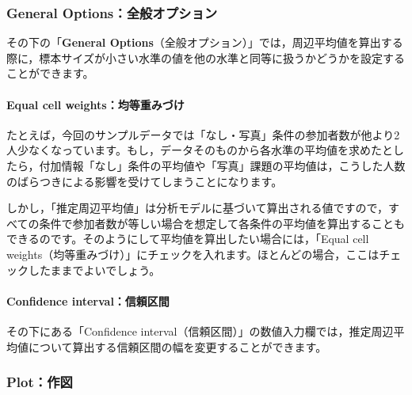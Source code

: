 \documentclass[
  12pt,
  a5jpaper,
  lualatex, ja=standard]{bxjsbook}
\begin{document}
\hypertarget{general-optionsux5168ux822cux30aaux30d7ux30b7ux30e7ux30f3}{%
\subsubsection*{General Options：全般オプション}\label{general-optionsux5168ux822cux30aaux30d7ux30b7ux30e7ux30f3}}

その下の「\textbf{General Options}（全般オプション）」では，周辺平均値を算出する際に，標本サイズが小さい水準の値を他の水準と同等に扱うかどうかを設定することができます。

\hypertarget{equal-cell-weightsux5747ux7b49ux91cdux307fux3065ux3051}{%
\paragraph*{Equal cell weights：均等重みづけ}\label{equal-cell-weightsux5747ux7b49ux91cdux307fux3065ux3051}}

たとえば，今回のサンプルデータでは「なし・写真」条件の参加者数が他より2人少なくなっています。もし，データそのものから各水準の平均値を求めたとしたら，付加情報「なし」条件の平均値や「写真」課題の平均値は，こうした人数のばらつきによる影響を受けてしまうことになります。

しかし，「推定周辺平均値」は分析モデルに基づいて算出される値ですので，すべての条件で参加者数が等しい場合を想定して各条件の平均値を算出することもできるのです。そのようにして平均値を算出したい場合には，「Equal cell weights（均等重みづけ）」にチェックを入れます。ほとんどの場合，ここはチェックしたままでよいでしょう。

\hypertarget{confidence-intervalux4fe1ux983cux533aux9593}{%
\paragraph*{Confidence interval：信頼区間}\label{confidence-intervalux4fe1ux983cux533aux9593}}

その下にある「Confidence interval（信頼区間）」の数値入力欄では，推定周辺平均値について算出する信頼区間の幅を変更することができます。

\hypertarget{plotux4f5cux56f3}{%
\subsubsection*{Plot：作図}\label{plotux4f5cux56f3}}
\end{document}
